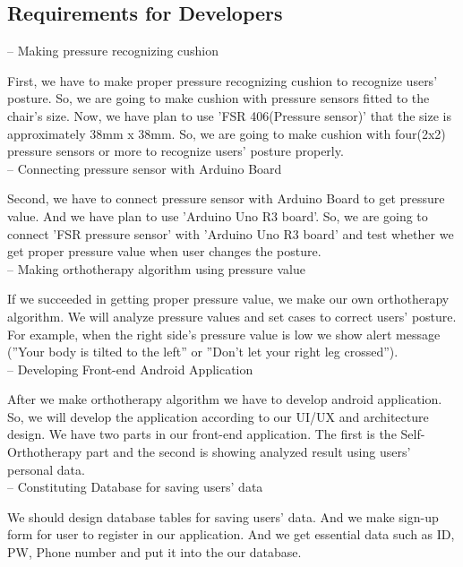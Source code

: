 \documentclass[conference]{IEEEtran}
\begin{document}
\subsection{Requirements for Developers}

-- Making pressure recognizing cushion

First, we have to make proper pressure recognizing cushion to recognize users' posture. So, we are going to make cushion with pressure sensors fitted to the chair's size. Now, we have plan to use 'FSR 406(Pressure sensor)' that the size is approximately 38mm x 38mm. So, we are going to make cushion with four(2x2) pressure sensors or more to recognize users' posture properly.   \\

-- Connecting  pressure sensor with Arduino Board

Second, we have to connect pressure sensor with Arduino Board to get pressure value. And we have plan to use 'Arduino Uno R3 board'. So, we are going to connect 'FSR pressure sensor' with 'Arduino Uno R3 board' and test whether we get proper pressure value when user changes the posture. \\

-- Making orthotherapy algorithm using pressure value

If we succeeded in getting proper pressure value, we make our own orthotherapy algorithm. We will analyze pressure values and set cases to correct users' posture. For example, when the right side's pressure value is low we show alert message (''Your body is tilted to the left'' or ''Don't let your right leg crossed''). \\

-- Developing  Front-end Android Application

After we make orthotherapy algorithm we have to develop 
android application. So, we will develop the application according to our UI/UX and architecture design. We have two parts in our front-end application. The first is the Self-Orthotherapy part and the second is showing analyzed result using users' personal data.\\

-- Constituting Database for saving users' data

We should design database tables for saving users' data.
And we make sign-up form for user to register in our application. And we get essential data such as ID, PW, Phone number and put it into the our database. \\
\end{document}

